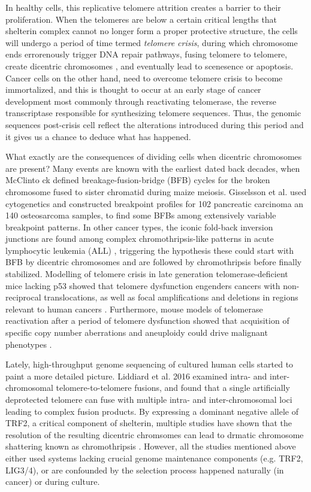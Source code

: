 \documentclass[phd,tocprelim]{cornell}
\begin{document}
In healthy cells, this replicative telomere attrition creates a barrier to their proliferation. When the telomeres are below a certain critical lengths that shelterin complex cannot no longer form a proper protective structure, the cells will undergo a period of time termed \textit{telomere crisis}, during which chromosome ends errorenously trigger DNA repair pathways, fusing telomere to telomere, create dicentric chromosomes \cite{Artandi2000-ab,Maciejowski2017-kx}, and eventually lead to scenesence or apoptosis. Cancer cells on the other hand, need to overcome telomere crisis to become immortalized, and this is thought to occur at an early stage of cancer development \cite{Shay2005-fb} most commonly through reactivating telomerase, the reverse transcriptase responsible for synthesizing telomere sequences. Thus, the genomic sequences post-crisis cell reflect the alterations introduced during this period and it gives us a chance to deduce what has happened.

What exactly are the consequences of dividing cells when dicentric chromosomes are present? Many events are known with the earliest dated back decades, when McClinto
ck \cite{McClintock1939-oi} defined breakage-fusion-bridge (BFB) cycles for the broken chromosome fused to sister chromatid during maize meiosis. Gisselsson et al. \cite{Gisselsson2001-hq} used cytogenetics and constructed breakpoint profiles for 102 pancreatic carcinoma an 140 osteosarcoma samples, to find some BFBs among extensively variable breakpoint patterns. In other cancer types, the iconic fold-back inversion junctions are found among complex chromothripsis-like patterns in acute lymphocytic leukemia (ALL) \cite{Li2014-mj}, triggering the hypothesis these could start with BFB by dicentric chromosomes and are followed by chromothripsis before finally stabilized. Modelling of telomere crisis in late generation telomerase-deficient mice lacking p53 showed that telomere dysfunction engenders cancers with non-reciprocal translocations, as well as focal amplifications and deletions in regions relevant to human cancers \cite{Artandi2000-ab,OHagan2002-rg}. Furthermore, mouse models of telomerase reactivation after a period of telomere dysfunction showed that acquisition of specific copy number aberrations and aneuploidy could drive malignant phenotypes \cite{Ding2012-at}.

Lately, high-throughput genome sequencing of cultured human cells started to paint a more detailed picture. Liddiard et al. 2016 \cite{Liddiard2016-ay} examined intra- and inter-chromosomal telomere-to-telomere fusions, and found that a single artificially deprotected telomere can fuse with multiple intra- and inter-chromosomal loci leading to complex fusion products. By expressing a dominant negative allele of TRF2, a critical component of shelterin, multiple studies have shown that the resolution of the resulting dicentric chromsomes can lead to drmatic chromosome shattering known as chromothripsis \cite{maciejowski2015,Umbreit2020-kr,Maciejowski2020-bw}. However, all the studies mentioned above either used systems lacking crucial genome maintenance components (e.g. TRF2, LIG3/4), or are confounded by the selection process happened naturally (in cancer) or during culture.
\end{document}

